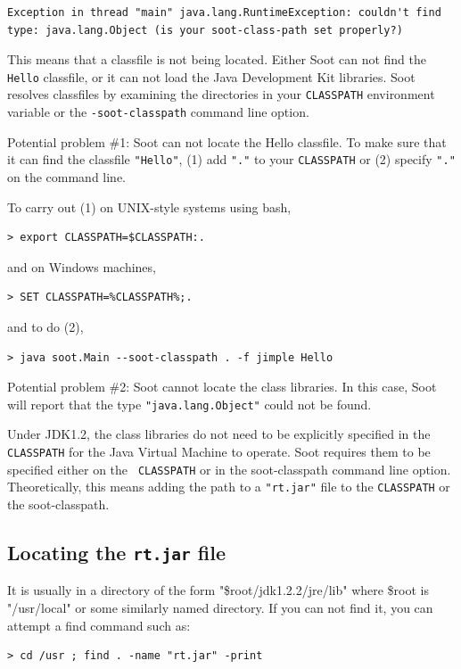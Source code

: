 \documentclass{article}
\begin{document}
\begin{verbatim}
Exception in thread "main" java.lang.RuntimeException: couldn't find type: java.lang.Object (is your soot-class-path set properly?)
\end{verbatim}

This means that a classfile is not being located.  Either Soot can not
find the {\tt Hello} classfile, or it can not load the Java
Development Kit libraries.  Soot resolves classfiles by examining the
directories in your {\tt CLASSPATH} environment variable or the
{\tt -soot-classpath} command line option.

Potential problem \#1: Soot can not locate the Hello classfile. To make
sure that it can find the classfile {\tt "Hello"}, (1) add {\tt "."} 
to your {\tt CLASSPATH} or (2) specify {\tt "."} on the command line.

To carry out (1) on UNIX-style systems using bash,
\begin{verbatim}
> export CLASSPATH=$CLASSPATH:.
\end{verbatim}
and on Windows machines,
\begin{verbatim}
> SET CLASSPATH=%CLASSPATH%;.
\end{verbatim}

and to do (2), 
\begin{verbatim}
> java soot.Main --soot-classpath . -f jimple Hello
\end{verbatim}

Potential problem \#2: Soot cannot locate the class libraries.  In this
case, Soot will report that the type {\tt "java.lang.Object"} could not
be found.

Under JDK1.2, the class libraries do not need to be explicitly
specified in the {\tt CLASSPATH} for the Java Virtual Machine to
operate.  Soot requires them to be specified either on the {\tt
CLASSPATH} or in the soot-classpath command line option.
Theoretically, this means adding the path to a {\tt "rt.jar"} file to the
{\tt CLASSPATH} or the soot-classpath.

\subsection{Locating the {\tt rt.jar} file}

It is usually in a directory of the form "\$root/jdk1.2.2/jre/lib"
where \$root is "/usr/local" or some similarly named directory.  If you
can not find it, you can attempt a find command such as:

\begin{verbatim}
> cd /usr ; find . -name "rt.jar" -print
\end{verbatim}
\end{document}

